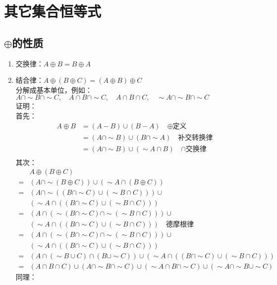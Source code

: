 \documentclass{book}
\begin{document}
\section{其它集合恒等式}
\subsection{$\oplus$的性质}
\begin{enumerate}
    \item 交换律：$A\oplus B=B\oplus A$
    \item 结合律：$A\oplus (B\oplus C)=(A\oplus B)\oplus C$\\
        分解成基本单位，例如：$A\cap\sim B\cap\sim C,\quad A\cap B\cap\sim C,\quad A\cap B\cap C,\quad\sim A\cap\sim B\cap\sim C$\\
        证明：\\
        首先：
        \begin{align*}
            A\oplus B&=(A-B)\cup (B-A)\quad\mbox{$\oplus$定义}\\
            &=(A\cap\sim B)\cup (B\cap\sim A)\quad\mbox{补交转换律}\\
            &=(A\cap\sim B)\cup(\sim A\cap B)\quad\mbox{$\cap$交换律}\\
        \end{align*}
        其次：
        \begin{align*}
            &A\oplus (B\oplus C)\\
            =&(A\cap\sim(B\oplus C))\cup (\sim A\cap (B\oplus C))\\
            =&(A\cap\sim ((B\cap\sim C)\cup (\sim B\cap C)))\cup\\
            &(\sim A\cap ((B\cap\sim C)\cup (\sim B\cap C)))\\
            =&(A\cap (\sim (B\cap\sim C)\cap\sim (\sim B\cap C)))\cup\\
            &(\sim A\cap ((B\cap\sim C)\cup (\sim B\cap C)))\quad\mbox{德摩根律}\\
            =&(A\cap (\sim (B\cap\sim C)\cap\sim (\sim B\cap C)))\cup\\
            &(\sim A\cap ((B\cap\sim C)\cup (\sim B\cap C)))\\
            =&(A\cap (\sim B\cup C)\cap (B\cup\sim C))\cup (\sim A\cap ((B\cap\sim C)\cup (\sim B\cap C)))\\
            =&(A\cap B\cap C)\cup (A\cap\sim B\cap\sim C)\cup (\sim A\cap B\cap\sim C)\cup (\sim A\cap\sim B\cup\sim C)
        \end{align*}
        同理：

\end{enumerate}
\end{document}
